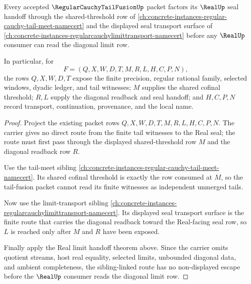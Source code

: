 \begin{theorem}
\label{thm:regular-cauchy-tail-fusion-limit-transport-link}
Every accepted $\RegularCauchyTailFusionUp$ packet factors its $\RealUp$ seal handoff through the shared-threshold row of \autoref{ch:concrete-instances-regular-cauchy-tail-meet-namecert} and the displayed seal transport surface of \autoref{ch:concrete-instances-regularcauchylimittransport-namecert} before any $\RealUp$ consumer can read the diagonal limit row.

In particular, for
$$
F=(Q,X,W,D,T,M,R,L,H,C,P,N),
$$
the rows $Q,X,W,D,T$ expose the finite precision, regular rational family, selected windows, dyadic ledger, and tail witnesses; $M$ supplies the shared cofinal threshold; $R,L$ supply the diagonal readback and seal handoff; and $H,C,P,N$ record transport, continuation, provenance, and the local name.
\end{theorem}
\begin{proof}
Project the existing packet rows $Q,X,W,D,T,M,R,L,H,C,P,N$. The carrier gives no direct route from the finite tail witnesses to the Real seal; the route must first pass through the displayed shared-threshold row $M$ and the diagonal readback row $R$.

Use the tail-meet sibling \autoref{ch:concrete-instances-regular-cauchy-tail-meet-namecert}. Its shared cofinal threshold is exactly the row consumed at $M$, so the tail-fusion packet cannot read its finite witnesses as independent unmerged tails.

Now use the limit-transport sibling \autoref{ch:concrete-instances-regularcauchylimittransport-namecert}. Its displayed seal transport surface is the finite route that carries the diagonal readback toward the Real-facing seal row, so $L$ is reached only after $M$ and $R$ have been exposed.

Finally apply the Real limit handoff theorem above. Since the carrier omits quotient streams, host real equality, selected limits, unbounded diagonal data, and ambient completeness, the sibling-linked route has no non-displayed escape before the $\RealUp$ consumer reads the diagonal limit row.
\end{proof}

